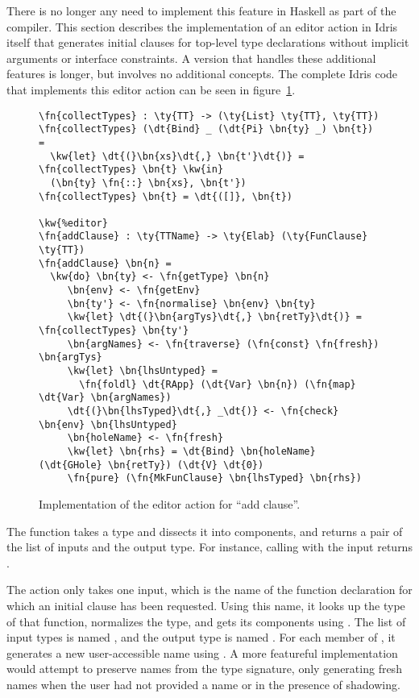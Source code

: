 There is no longer any need to implement this feature in Haskell as
part of the compiler. This section describes the implementation of an
editor action in Idris itself that generates initial clauses for top-level
type declarations without implicit arguments or interface
constraints. A version that handles these additional features is
longer, but involves no additional concepts. The complete Idris code that
implements this editor action can be seen in figure~\ref{code:addClause}.

\begin{figure}[ht]
\begin{Verbatim}
\fn{collectTypes} : \ty{TT} -> (\ty{List} \ty{TT}, \ty{TT})
\fn{collectTypes} (\dt{Bind} _ (\dt{Pi} \bn{ty} _) \bn{t}) =
  \kw{let} \dt{(}\bn{xs}\dt{,} \bn{t'}\dt{)} = \fn{collectTypes} \bn{t} \kw{in}
  (\bn{ty} \fn{::} \bn{xs}, \bn{t'})
\fn{collectTypes} \bn{t} = \dt{([]}, \bn{t})

\kw{%editor}
\fn{addClause} : \ty{TTName} -> \ty{Elab} (\ty{FunClause} \ty{TT})
\fn{addClause} \bn{n} =
  \kw{do} \bn{ty} <- \fn{getType} \bn{n}
     \bn{env} <- \fn{getEnv}
     \bn{ty'} <- \fn{normalise} \bn{env} \bn{ty}
     \kw{let} \dt{(}\bn{argTys}\dt{,} \bn{retTy}\dt{)} = \fn{collectTypes} \bn{ty'}
     \bn{argNames} <- \fn{traverse} (\fn{const} \fn{fresh}) \bn{argTys}
     \kw{let} \bn{lhsUntyped} =
       \fn{foldl} \dt{RApp} (\dt{Var} \bn{n}) (\fn{map} \dt{Var} \bn{argNames})
     \dt{(}\bn{lhsTyped}\dt{,} _\dt{)} <- \fn{check} \bn{env} \bn{lhsUntyped}
     \bn{holeName} <- \fn{fresh}
     \kw{let} \bn{rhs} = \dt{Bind} \bn{holeName} (\dt{GHole} \bn{retTy}) (\dt{V} \dt{0})
     \fn{pure} (\fn{MkFunClause} \bn{lhsTyped} \bn{rhs})
\end{Verbatim}
\caption{Implementation of the editor action for ``add clause''.}
\label{code:addClause}
\end{figure}

The  function takes a type and dissects it into components, and returns
a pair of the list of inputs and the output type. For instance,
calling  with the input 
returns .

The  action only takes one input, which is the name of
the function declaration for which an initial clause has been
requested.  Using this name, it looks up the type of that function,
normalizes the type, and gets its components using .
The list of input types is named , and the output type is
named . For each member of , it generates a
new user-accessible name using . A more featureful
implementation would attempt to preserve names from the type
signature, only generating fresh names when the user had not provided
a name or in the presence of shadowing.

